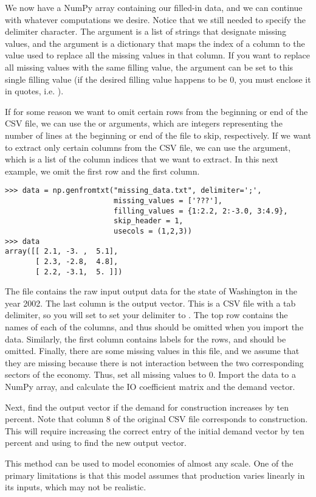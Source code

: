 We now have a NumPy array containing our filled-in data, and we can continue with whatever computations we desire. Notice
that we still needed to specify the delimiter character. The  argument is a list of strings that
designate missing values, and the  argument is a dictionary that maps the index of a column to the
value used to replace all the missing values in that column.
If you want to replace all missing values with the same
filling value, the  argument can be set to this single filling value (if the desired filling value
happens to be 0, you must enclose it in quotes, i.e. ).

If for some reason we want to omit certain rows from the beginning or end of the CSV file, we can use the  or 
arguments, which are integers representing the number of lines at the beginning or end of the file to skip, respectively.
If we want to extract only certain columns from the CSV file, we can use the  argument, which is a list of
the column indices that we want to extract. In this next example, we omit the first row and the first column.

\begin{lstlisting}
>>> data = np.genfromtxt("missing_data.txt", delimiter=';',
                         missing_values = ['???'],
                         filling_values = {1:2.2, 2:-3.0, 3:4.9},
                         skip_header = 1,
                         usecols = (1,2,3))
>>> data
array([[ 2.1, -3. ,  5.1],
       [ 2.3, -2.8,  4.8],
       [ 2.2, -3.1,  5. ]])

\end{lstlisting}

\begin{problem}
The file  contains the raw input output data for the state of Washington in the year 2002.
The last column is the output vector. This is a CSV file with a tab delimiter, so you will set to set your
delimiter to . The top row contains the names of each of the columns, and thus should be omitted when
you import the data. Similarly, the first column contains labels for the rows, and should be omitted. Finally,
there are some missing values in this file, and we assume that they are missing because there is not interaction
between the two corresponding sectors of the economy. Thus, set all missing values to 0. Import the data
to a NumPy array, and calculate the IO coefficient matrix and the demand vector.

Next, find the output vector if the demand for construction increases by ten percent.
Note that column 8 of the original CSV file corresponds to construction.
This will require increasing the correct entry of the initial
demand vector by ten percent and using  to find the new output vector.
\end{problem}

This method can be used to model economies of almost any scale.
One of the primary limitations is that this model assumes that production varies linearly in its inputs, which may not be realistic.
